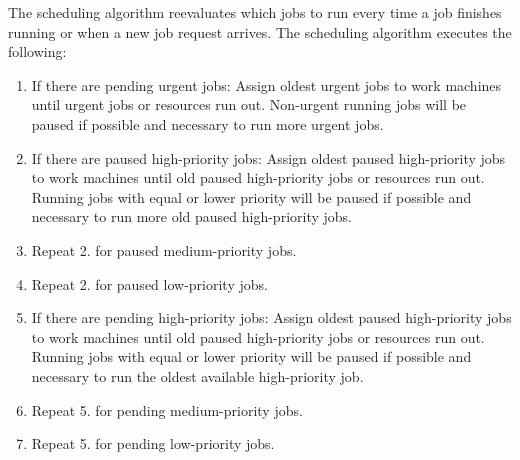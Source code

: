 The scheduling algorithm reevaluates which jobs to run every time a job finishes running or when a new job request arrives.
The scheduling algorithm executes the following:
\begin{enumerate}
\item If there are pending urgent jobs:
Assign oldest urgent jobs to work machines until urgent jobs or resources run out.
Non-urgent running jobs will be paused if possible and necessary to run more urgent jobs.
\item If there are paused high-priority jobs:
Assign oldest paused high-priority jobs to work machines until old paused high-priority jobs or resources run out.
Running jobs with equal or lower priority will be paused if possible and necessary to run more old paused high-priority jobs.
\item Repeat 2. for paused medium-priority jobs.
\item Repeat 2. for paused low-priority jobs.
\item If there are pending high-priority jobs:
Assign oldest paused high-priority jobs to work machines until old paused high-priority jobs or resources run out.
Running jobs with equal or lower priority will be paused if possible and necessary to run the oldest available high-priority job.
\item Repeat 5. for pending medium-priority jobs.
\item Repeat 5. for pending low-priority jobs.
\end{enumerate}